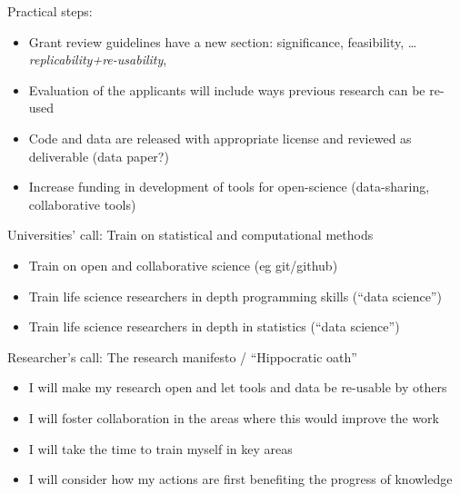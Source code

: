 \documentclass[ignorenonframetext,]{beamer}
\begin{document}
\begin{frame}{Practical steps:}

\begin{itemize}[<+->]
\itemsep1pt\parskip0pt
\item
  Grant review guidelines have a new section: significance, feasibility,
  \ldots{} \emph{replicability+re-usability},
\item
  Evaluation of the applicants will include ways previous research can
  be re-used
\item
  Code and data are released with appropriate license and reviewed as
  deliverable (data paper?)
\item
  Increase funding in development of tools for open-science
  (data-sharing, collaborative tools)
\end{itemize}

\end{frame}

\begin{frame}{Universities' call: Train on statistical and computational
methods}

\begin{itemize}[<+->]
\itemsep1pt\parskip0pt
\item
  Train on open and collaborative science (eg git/github)
\item
  Train life science researchers in depth programming skills (``data
  science'')
\item
  Train life science researchers in depth in statistics (``data
  science'')
\end{itemize}

\end{frame}

\begin{frame}{Researcher's call: The research manifesto / ``Hippocratic
oath''}

\begin{itemize}[<+->]
\itemsep1pt\parskip0pt
\item
  I will make my research open and let tools and data be re-usable by
  others
\item
  I will foster collaboration in the areas where this would improve the
  work
\item
  I will take the time to train myself in key areas
\item
  I will consider how my actions are first benefiting the progress of
  knowledge
\end{itemize}

\end{frame}
\end{document}
